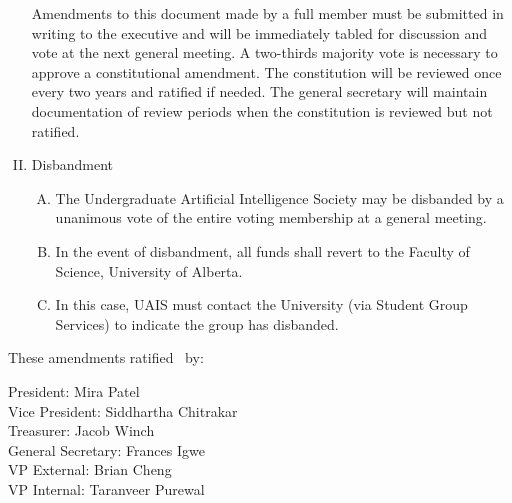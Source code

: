 \documentclass[11pt]{article}
\begin{document}
\begin{enumerate}[I.]
    Amendments to this document made by a full member must be submitted in
    writing to the executive and will be immediately tabled for discussion and vote at the next general meeting. A two-thirds majority vote is necessary to approve a constitutional amendment. The constitution will be reviewed once every two years and ratified if needed. The general secretary will maintain documentation of review periods when the constitution is reviewed but not ratified.
  \item Disbandment
    \begin{enumerate}[A)]
      \item The Undergraduate Artificial Intelligence Society may be disbanded by a unanimous vote of the entire voting membership at a general meeting.
      \item  In the event of disbandment, all funds shall revert to the Faculty of Science, University of Alberta.
      \item In this case, UAIS must contact the University (via Student Group Services) to indicate the group has disbanded.
    \end{enumerate}
\end{enumerate}

These amendments ratified \thedate\ by:

President: Mira Patel \\
Vice President: Siddhartha Chitrakar \\
Treasurer: Jacob Winch \\
General Secretary: Frances Igwe \\
VP External: Brian Cheng \\
VP Internal: Taranveer Purewal \\
\end{document}
